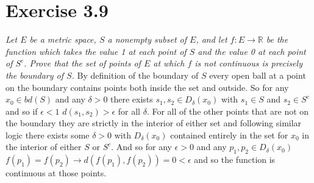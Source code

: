 \documentclass{amsart}
\begin{document}
    \section{Exercise 3.9}
    \emph{Let $E$ be a metric space, $S$ a nonempty subset of $E$, and let $f : E \rightarrow \mathbb{R} $
    be the function which takes the value 1 at each point of $S$ and the value 0 at each point of
    $S^c$. Prove that the set of points of $E$ at which $f$ is not continuous is precisely the boundary
    of $S$.}
    By definition of the boundary of $S$ every open ball at a point on the boundary contains points both inside the set and outside. So for any $x_0 \in bd(S)$ and any $\delta > 0$ there exists $s_1,s_2 \in D_\delta(x_0)$ with $s_1 \in S$ and $s_2 \in S^{c}$ and so if $\epsilon < 1$ $d(s_1,s_2) > \epsilon $ for all $\delta $.
    For all of the other points that are not on the boundary they are strictly in the interior of either set and following similar logic there exists some $\delta > 0$ with $D_\delta(x_0)$ contained entirely in the set for $x_0$ in the interior of either $S$ or $S^{c}$.
    And so for any $\epsilon > 0$ and any $p_1,p_2 \in D_\delta(x_0)$ $f(p_1) = f(p_2) \rightarrow d(f(p_1),f(p_2)) = 0 < \epsilon $ and so the function is continuous at those points.
\end{document}
